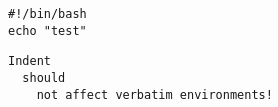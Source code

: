 \begin{verbatim}
#!/bin/bash
echo "test"
\end{verbatim}

\begin{lstlisting}
Indent
  should
    not affect verbatim environments!
\end{lstlisting}

